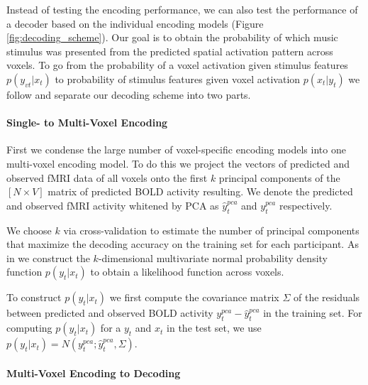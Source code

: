 Instead of testing the encoding performance, we can also test the performance of a decoder based on the individual encoding models \citep{NG11} (Figure \ref{fig:decoding_scheme}). Our goal is to obtain the probability of which music stimulus was presented from the predicted spatial activation pattern across voxels. To go from the probability of a voxel activation given stimulus features $p(y_{vt}|x_{t})$ to probability of stimulus features given voxel activation $p(x_{t}|y_{t})$ we follow \citet{NG09} and separate our decoding scheme into two parts. 

\paragraph{Single- to Multi-Voxel Encoding}

First we condense the large number of voxel-specific encoding models into one multi-voxel encoding model.
To do this we project the vectors of predicted and observed f{MRI} data of all voxels onto the first $k$ principal components of the $[N\times V]$ matrix of predicted BOLD activity resulting.
We denote the predicted and observed fMRI activity whitened by PCA as $\hat{y}^{pca}_{t}$ and $y^{pca}_{t}$ respectively.

We choose $k$ via cross-validation to estimate the number of principal components that maximize the decoding accuracy on the training set for each participant. As in \citet{NG09} we construct the $k$-dimensional multivariate normal probability density function $p(y_{t}|x_{t})$ to obtain a likelihood function across voxels. 

To construct $p(y_{t}|x_{t})$ we first compute the covariance matrix $\Sigma$ of the residuals between predicted and observed BOLD activity $y^{pca}_{t}-\hat{y}^{pca}_{t}$ in the training set.
For computing $p(y_{t}|x_{t})$ for a $y_{t}$ and $x_{t}$ in the test set, we use $p(y_{t}|x_{t}) = N(y^{pca}_{t};\hat{y}^{pca}_{t},\Sigma)$.

\paragraph{Multi-Voxel Encoding to Decoding}

